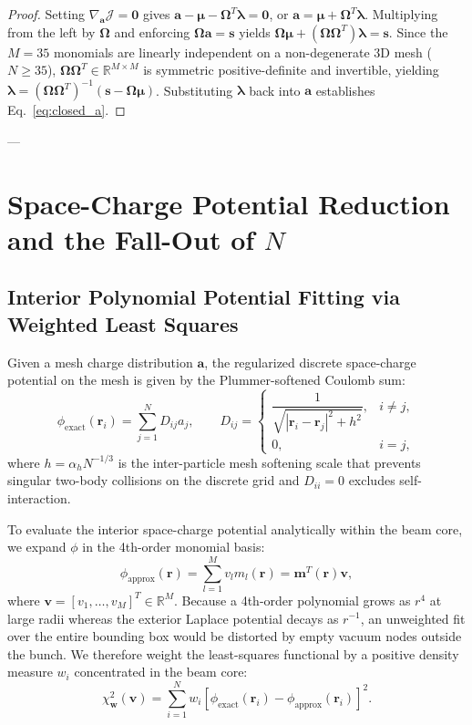 \documentclass[11pt,a4paper]{article}
\newcommand{\bOmega}{\mathbf{\Omega}}
\begin{document}
\begin{proof}
Setting $\nabla_{\bm{a}} \mathcal{J} = \bm{0}$ gives $\bm{a} - \bm{\mu} - \bOmega^T \bm{\lambda} = \bm{0}$, or $\bm{a} = \bm{\mu} + \bOmega^T \bm{\lambda}$. Multiplying from the left by $\bOmega$ and enforcing $\bOmega\bm{a} = \bm{s}$ yields $\bOmega\bm{\mu} + (\bOmega\bOmega^T)\bm{\lambda} = \bm{s}$. Since the $M=35$ monomials are linearly independent on a non-degenerate 3D mesh ($N \ge 35$), $\bOmega\bOmega^T \in \mathbb{R}^{M \times M}$ is symmetric positive-definite and invertible, yielding $\bm{\lambda} = (\bOmega\bOmega^T)^{-1}(\bm{s} - \bOmega\bm{\mu})$. Substituting $\bm{\lambda}$ back into $\bm{a}$ establishes Eq.~\eqref{eq:closed_a}.
\end{proof}

---

\section{Space-Charge Potential Reduction and the Fall-Out of \texorpdfstring{$N$}{N}}

\subsection{Interior Polynomial Potential Fitting via Weighted Least Squares}
Given a mesh charge distribution $\bm{a}$, the regularized discrete space-charge potential on the mesh is given by the Plummer-softened Coulomb sum:
\begin{equation}
    \phi_{\mathrm{exact}}(\bm{r}_i) = \sum_{j=1}^N D_{ij} a_j, \qquad D_{ij} = \begin{cases} \dfrac{1}{\sqrt{|\bm{r}_i - \bm{r}_j|^2 + h^2}}, & i \ne j, \\[8pt] 0, & i = j, \end{cases}
    \label{eq:phi_exact}
\end{equation}
where $h = \alpha_h N^{-1/3}$ is the inter-particle mesh softening scale that prevents singular two-body collisions on the discrete grid and $D_{ii} = 0$ excludes self-interaction.

To evaluate the interior space-charge potential analytically within the beam core, we expand $\phi$ in the 4th-order monomial basis:
\begin{equation}
    \phi_{\mathrm{approx}}(\bm{r}) = \sum_{l=1}^M v_l m_l(\bm{r}) = \bm{m}^T(\bm{r}) \bm{v},
    \label{eq:phi_approx}
\end{equation}
where $\bm{v} = [v_1, \dots, v_M]^T \in \mathbb{R}^M$. Because a 4th-order polynomial grows as $r^4$ at large radii whereas the exterior Laplace potential decays as $r^{-1}$, an unweighted fit over the entire bounding box would be distorted by empty vacuum nodes outside the bunch. We therefore weight the least-squares functional by a positive density measure $w_i$ concentrated in the beam core:
\begin{equation}
    \chi^2_{\bm{w}}(\bm{v}) = \sum_{i=1}^N w_i \left[ \phi_{\mathrm{exact}}(\bm{r}_i) - \phi_{\mathrm{approx}}(\bm{r}_i) \right]^2.
    \label{eq:chi2_pot}
\end{equation}
\end{document}
